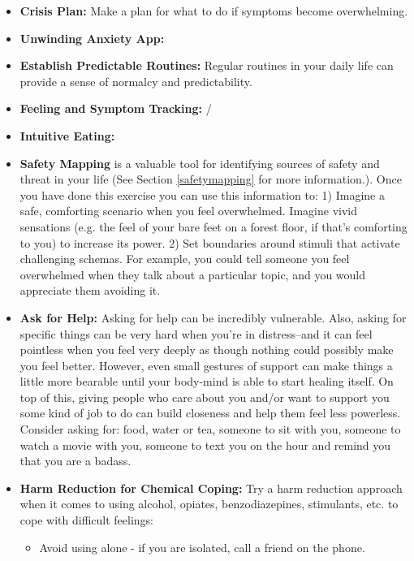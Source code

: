 \documentclass[12pt,letterpaper]{book}
\begin{document}
\begin{itemize}
\begin{itemize}
    \end{itemize}
    \item \textbf{Crisis Plan:} Make a plan for what to do if symptoms become overwhelming. 
    \item \textbf{Unwinding Anxiety App:} 
    \item \textbf{Establish Predictable Routines:} Regular routines in your daily life can provide a sense of normalcy and predictability. 
    \item \textbf{Feeling and Symptom Tracking:} /
    \item \textbf{Intuitive Eating:} 
    \item \textbf{Safety Mapping} is a valuable tool for identifying sources of safety and threat in your life (See Section \ref{safetymapping} for more information.). Once you have done this exercise you can use this information to: 1) Imagine a safe, comforting scenario when you feel overwhelmed. Imagine vivid sensations (e.g. the feel of your bare feet on a forest floor, if that's comforting to you) to increase its power. 2) Set boundaries around stimuli that activate challenging schemas. For example, you could tell someone you feel overwhelmed when they talk about a particular topic, and you would appreciate them avoiding it.
    \item \textbf{Ask for Help:} Asking for help can be incredibly vulnerable. Also, asking for specific things can be very hard when you're in distress–and it can feel pointless when you feel very deeply as though nothing could possibly make you feel better. However, even small gestures of support can make things a little more bearable until your body-mind is able to start healing itself. On top of this, giving people who care about you and/or want to support you some kind of job to do can build closeness and help them feel less powerless. Consider asking for: food, water or tea, someone to sit with you, someone to watch a movie with you, someone to text you on the hour and remind you that you are a badass.
    \item \textbf{Harm Reduction for Chemical Coping:} Try a harm reduction approach when it comes to using alcohol, opiates, benzodiazepines, stimulants, etc. to cope with difficult feelings:
    \begin{itemize}
        \item Avoid using alone - if you are isolated, call a friend on the phone.

\end{itemize}
\end{itemize}
\end{document}
